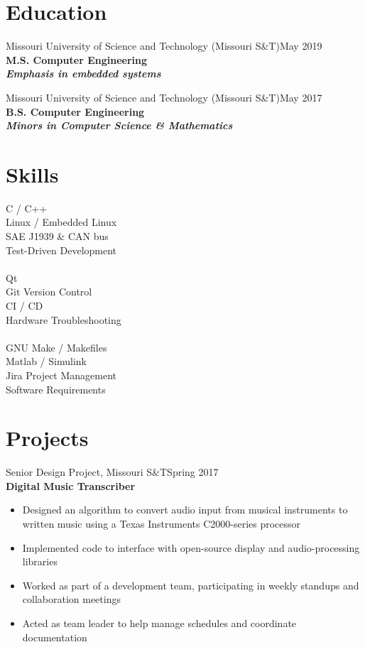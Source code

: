 \documentclass[resmargin]{res}
\begin{document}
\begin{resume}
\section{Education}
Missouri University of Science and Technology (Missouri S\&T)\hfill May 2019 \\
{\bf M.S. Computer Engineering}\\%
{\bf \it Emphasis in embedded systems}

Missouri University of Science and Technology (Missouri S\&T)\hfill May 2017 \\
{\bf B.S. Computer Engineering}\\%
{\bf \it Minors in Computer Science \& Mathematics}\\

\section{Skills}
\begin{multicols}{3}
	C / C++\\
	Linux / Embedded Linux\\
	SAE J1939 \& CAN bus\\
	Test-Driven Development\\
	\\
	Qt\\
	Git Version Control\\
	CI / CD\\
	Hardware Troubleshooting\\
	\\
	GNU Make / Makefiles\\
	Matlab / Simulink\\
	Jira Project Management\\
	Software Requirements\\
\end{multicols}


\iffalse
\section{Projects}
Senior Design Project, Missouri S\&T\hfill Spring 2017\\
{\bf Digital Music Transcriber}
\begin{itemize}
	\item Designed an algorithm to convert audio input from musical instruments to written music using a Texas Instruments C2000-series processor
	\item Implemented code to interface with open-source display and audio-processing libraries
	\item Worked as part of a development team, participating in weekly standups and collaboration meetings
	\item Acted as team leader to help manage schedules and coordinate documentation
\end{itemize}


\end{resume}
\end{document}
